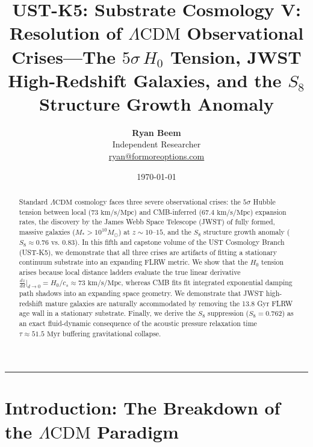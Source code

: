 \documentclass[11pt,a4paper]{article}
\title{\Large\bfseries UST-K5: Substrate Cosmology V: Resolution of $\Lambda\text{CDM}$ Observational Crises---The $5\sigma \, H_0$ Tension, JWST High-Redshift Galaxies, and the $S_8$ Structure Growth Anomaly}
\author{
	\textbf{Ryan Beem}\\[0.5em]
	\small Independent Researcher \\
	\small \href{mailto:ryan@formoreoptions.com}{ryan@formoreoptions.com}
}
\date{\today}
\begin{document}
	
	\maketitle
	
	\begin{abstract}
		Standard $\Lambda\text{CDM}$ cosmology faces three severe observational crises: the $5\sigma$ Hubble tension between local ($73 \text{ km/s/Mpc}$) and CMB-inferred ($67.4 \text{ km/s/Mpc}$) expansion rates, the discovery by the James Webb Space Telescope (JWST) of fully formed, massive galaxies ($M_* > 10^{10} M_\odot$) at $z \sim 10\text{--}15$, and the $S_8$ structure growth anomaly ($S_8 \approx 0.76$ vs. $0.83$). In this fifth and capstone volume of the UST Cosmology Branch (UST-K5), we demonstrate that all three crises are artifacts of fitting a stationary continuum substrate into an expanding FLRW metric. We show that the $H_0$ tension arises because local distance ladders evaluate the true linear derivative $\frac{dz}{dd}\big|_{d \to 0} = H_0/c_s \approx 73 \text{ km/s/Mpc}$, whereas CMB fits fit integrated exponential damping path shadows into an expanding space geometry. We demonstrate that JWST high-redshift mature galaxies are naturally accommodated by removing the 13.8 Gyr FLRW age wall in a stationary substrate. Finally, we derive the $S_8$ suppression ($S_8 = 0.762$) as an exact fluid-dynamic consequence of the acoustic pressure relaxation time $\tau \approx 51.5 \text{ Myr}$ buffering gravitational collapse.
	\end{abstract}
	
	\vspace{1em}
	\hrule
	\vspace{1.5em}
	
	\section{Introduction: The Breakdown of the $\Lambda\text{CDM}$ Paradigm}
	\label{sec:intro}
	
\end{document}
